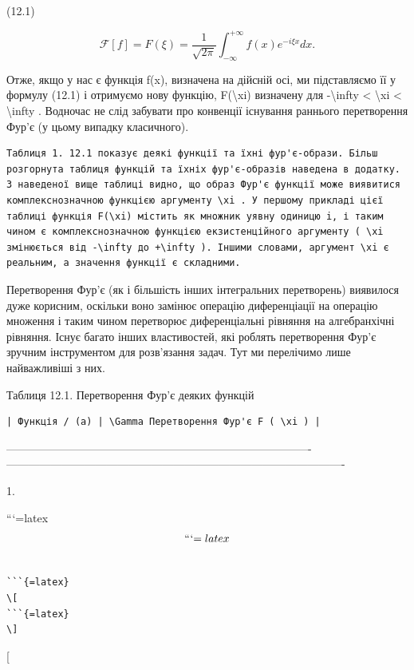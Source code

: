 \documentclass[
]{article}
\begin{document}
(12.1)

\[
\mathcal{F}[f] = F(\xi) = \frac{1}{\sqrt{2\pi}} \int_{-\infty}^{+\infty} f(x) e^{-i\xi x} dx.
\]

Отже, якщо у нас є функція f(x), визначена на дійсній осі, ми
підставляємо її у формулу (12.1) і отримуємо нову функцію,
F(\textbackslash xi) визначену для -\textbackslash infty \textless{}
\textbackslash xi \textless{} \textbackslash infty . Водночас не слід
забувати про конвенції існування раннього перетворення Фур'є (у цьому
випадку класичного).

\begin{verbatim}
Таблиця 1. 12.1 показує деякі функції та їхні фур'є-образи. Більш розгорнута таблиця функцій та їхніх фур'є-образів наведена в додатку. З наведеної вище таблиці видно, що образ Фур'є функції може виявитися комплекснозначною функцією аргументу \xi . У першому прикладі цієї таблиці функція F(\xi) містить як множник уявну одиницю i, і таким чином є комплекснозначною функцією екзистенційного аргументу ( \xi змінюється від -\infty до +\infty ). Іншими словами, аргумент \xi є реальним, а значення функції є складними.
\end{verbatim}

Перетворення Фур'є (як і більшість інших інтегральних перетворень)
виявилося дуже корисним, оскільки воно замінює операцію диференціації на
операцію множення і таким чином перетворює диференціальні рівняння на
алгебранхічні рівняння. Існує багато інших властивостей, які роблять
перетворення Фур'є зручним інструментом для розв'язання задач. Тут ми
перелічимо лише найважливіші з них.

Таблиця 12.1. Перетворення Фур'є деяких функцій

\begin{verbatim}
| Функція / (a) | \Gamma Перетворення Фур'є F ( \xi ) |
\end{verbatim}

\textbar----------------------------------------------------------------------------------\textbar-------------------------------------------------------------------------------------------\textbar{}

1.

```{=latex}
\[
```{=latex}
\]

\begin{verbatim}

```{=latex}
\[
```{=latex}
\]
\end{verbatim}

{[}
\end{document}
